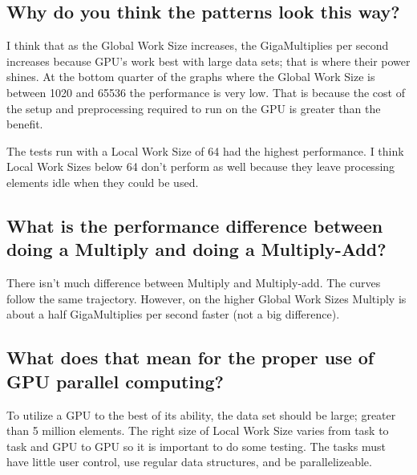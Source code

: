 \documentclass[onecolumn,draftclsnofoot, 10pt, compsoc]{IEEEtran}
\begin{document}
	
	
	
	
	
	
	
	\subsection{Why do you think the patterns look this way?}
		I think that as the Global Work Size increases, the GigaMultiplies per second increases because GPU's work best with large data sets; that is where their power shines.
		At the bottom quarter of the graphs where the Global Work Size is between 1020 and 65536 the performance is very low. That is because the cost of the setup and preprocessing required to run on the GPU is greater than the benefit.
			
		The tests run with a Local Work Size of 64 had the highest performance. I think Local Work Sizes below 64 don't perform as well because they leave processing elements idle when they could be used.









	\subsection{What is the performance difference between doing a Multiply and doing a Multiply-Add?}
		There isn't much difference between Multiply and Multiply-add. The curves follow the same trajectory. However, on the higher Global Work Sizes Multiply is about a half GigaMultiplies per second faster (not a big difference). 
	





	
	
	
	\subsection{What does that mean for the proper use of GPU parallel computing?}
		To utilize a GPU to the best of its ability, the data set should be large; greater than 5 million elements. The right size of Local Work Size varies from task to task and GPU to GPU so it is important to do some testing. The tasks must have little user control, use regular data structures, and be parallelizeable. 
\end{document}
